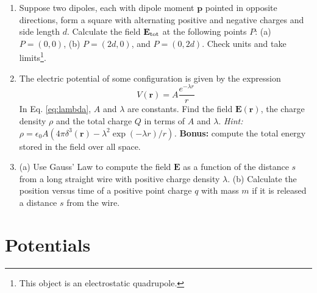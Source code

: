\documentclass[10pt]{article}
\begin{document}
\begin{enumerate}
\item Suppose two dipoles, each with dipole moment $\mathbf{p}$ pointed in opposite directions, form a square with alternating positive and negative charges and side length $d$.  Calculate the field $\mathbf{E}_{\rm tot}$ at the following points $P$: (a) $P = (0,0)$, (b) $P = (2d,0)$, and $P = (0,2d)$.  Check units and take limits\footnote{This object is an electrostatic quadrupole.}.  \\ \vspace{5cm}
\item The electric potential of some configuration is given by the expression
\begin{equation}
V(\mathbf{r}) = A \frac{e^{-\lambda r}}{r} \label{eq:lambda}
\end{equation}
In Eq. \ref{eq:lambda}, $A$ and $\lambda$ are constants.  Find the field $\mathbf{E}(\mathbf{r})$, the charge density $\rho$ and the total charge $Q$ in terms of $A$ and $\lambda$.  \textit{Hint: $\rho = \epsilon_0 A(4\pi\delta^3(\mathbf{r}) - \lambda^2\exp(-\lambda r)/r)$.} \textbf{Bonus:} compute the total energy stored in the field over all space. \\ \vspace{5cm}
\item (a) Use Gauss' Law to compute the field $\mathbf{E}$ as a function of the distance $s$ from a long straight wire with positive charge density $\lambda$. (b) Calculate the position versus time of a positive point charge $q$ with mass $m$ if it is released a distance $s$ from the wire. \\ \vspace{5cm}
\end{enumerate}

\clearpage

\section{Potentials}
\end{document}
